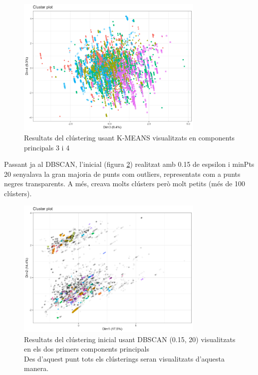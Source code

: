 \begin{figure}[H]
    \centering
    \includegraphics[width=0.8\textwidth]{Images/4_clustering/DBSCAN/kmeans34.png}
    \caption{Resultats del clústering usant K-MEANS visualitzats en components principals 3 i 4}
    \label{fig:KMEANS_34}
\end{figure}

Passant ja al DBSCAN, l’inicial (figura \ref{fig:DBSCAN_inicial}) realitzat amb 0.15 de espsilon i minPts 20 senyalava la gran majoria de punts com outliers, representats com a punts negres transparents. A més, creava molts clústers però molt petits (més de 100 clústers).

\begin{figure}[H]
    \centering
    \includegraphics[width=0.8\textwidth]{Images/4_clustering/DBSCAN/baddbscan.png}
    \caption{Resultats del clústering inicial usant DBSCAN (0.15, 20) visualitzats en els dos primers components principals \\
    Des d'aquest punt tots els clústerings seran visualitzats d'aquesta manera.}
    \label{fig:DBSCAN_inicial}
\end{figure}


